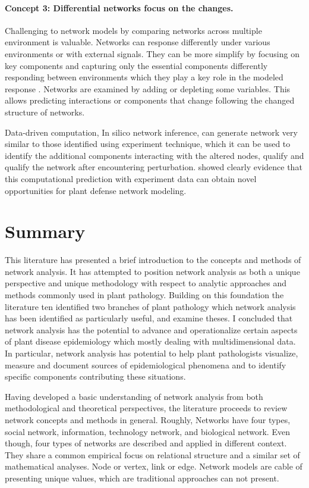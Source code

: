 \paragraph{Concept 3: Differential networks focus on the changes.} Challenging to network models by comparing networks across multiple environment is valuable. Networks can response differently under various environments or with external signals. They can be more simplify by focusing on key components and capturing only the essential components differently responding between environments which they play a key role in the modeled response . Networks are examined by adding or depleting some variables. This allows predicting interactions or components that change following the changed structure of networks. 

Data-driven computation, In silico network inference, can generate network very similar to those identified using experiment technique, which it can be used to identify the additional components interacting with the altered nodes, qualify and qualify the network after encountering perturbation.  showed clearly evidence that this computational prediction with experiment data can obtain novel opportunities for plant defense network modeling. 

\section*{Summary}
\label{ch:summary}

This literature has presented a brief introduction to the concepts and methods of network analysis. It has attempted to position network analysis as both a unique perspective and unique methodology with respect to analytic approaches and methods commonly used in plant pathology. Building on this foundation the literature ten identified two branches of plant pathology which network analysis has been identified as particularly useful, and examine theses. I concluded that network analysis has the potential to advance and operationalize certain aspects of plant disease epidemiology which mostly dealing with multidimensional data. In particular, network analysis has potential to help plant pathologists visualize, measure and document sources of epidemiological phenomena and to identify specific components contributing these situations.  

Having developed a basic understanding of network analysis from both methodological and theoretical perspectives, the literature proceeds to review network concepts and methods in general. Roughly, Networks have four types, social network, information, technology network, and biological network. Even though, four types of networks are described and applied in different context. They share a common empirical focus on relational structure and a similar set of mathematical analyses. Node or vertex, link or edge. Network models are cable of presenting unique values, which are traditional approaches can not present. 

